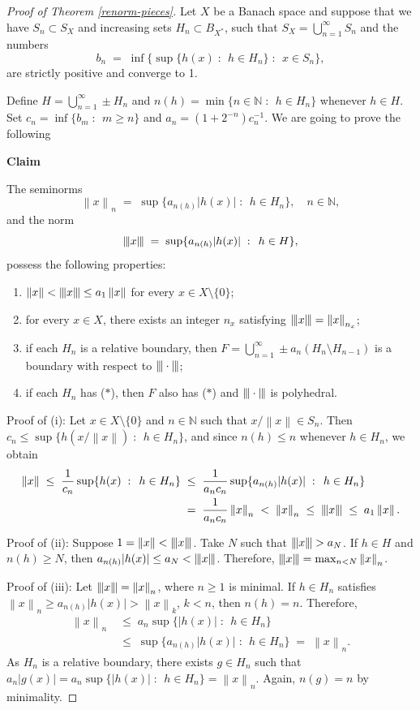\documentclass[12pt,a4paper]{amsart}
\theoremstyle{definition}
\theoremstyle{remark}
\newcommand{\n}[1]{\ensuremath{\left\|{#1}\right\|}}
\newcommand{\N}{\mathbb{N}}
\newcommand{\set}[2]{\{{#1} \;:\;\, {#2}\}}
\newcommand{\st}{($*$)}
\newcommand{\tri}{{\displaystyle |\kern-.9pt|\kern-.9pt|}}
\newcommand{\tn}[1]{\ensuremath{\tri{#1}\tri}}
\newcommand{\tndot}{\ensuremath{\tri\cdot\tri}}
\begin{document}
\begin{proof}[Proof of Theorem \ref{renorm-pieces}]
Let $X$ be a Banach space and suppose that we have $S_n \subset S_X$
and increasing sets $H_n \subset B_{X^*}$, such that $S_X = \bigcup_{n=1}^\infty S_n$ and
the numbers
\[
b_n \;=\; \inf\set{\sup\set{h(x)}{h \in  H_n}}{x \in S_n},
\]
are strictly positive and converge to 1.

Define $H = \bigcup_{n=1}^\infty \pm H_n$ and $n(h)=\min\set{n \in \N}{h \in H_n}$
whenever $h \in H$. Set $c_n = \inf\set{b_m}{m \geq n}$ and $a_n =
(1+2^{-n})c_n^{-1}$. We are going to prove the following

\textbf{Claim }

The seminorms
\[
\n{x}_n \;=\; \sup\set{a_{n(h)}|h(x)|}{h \in H_n}, \quad n \in \N,
\]
and the norm
\[
\tn{x} \;=\; \sup\set{a_{n(h)}|h(x)|}{h \in H},
\]
possess the following properties:

{\renewcommand{\theenumi}{\roman{enumi}}
\begin{enumerate}
\item \label{lemma:1:1} $\n{x} < \tn{x}\leq a_1 \n{x}$ for every
$x\in X\setminus\{0\}$;
\item \label{lemma:1:2} for every $x\in X$, there exists an integer
$n_x$ satisfying $\tn{x}=\n{x}_{n_x}$;
\item \label{lemma:1:3} if each $H_n$ is a relative boundary, then
$F = \bigcup_{n=1}^{\infty}\pm a_n (H_n\setminus H_{n-1})$ is a
boundary with respect to $\tndot$;
\item if each $H_n$ has {\st}, then $F$ also has {\st} and $\tndot$
is polyhedral.
\end{enumerate}}

Proof of (i): Let $x \in X\setminus\{0\}$ and $n \in \N$ such that $x/\n{x}
\in S_n$. Then $c_n \leq \sup\set{h(x/\n{x})}{h \in H_n}$, and since
$n(h) \leq n$ whenever $h \in H_n$, we obtain
\begin{align*}
\n{x} \;\leq\; \frac{1}{c_n}\sup\set{h(x)}{h \in H_n}
&\;\leq\; \frac{1}{a_n c_n}\sup\set{a_{n(h)}|h(x)|}{h \in H_n}\\
&\;=\; \frac{1}{a_n c_n}\n{x}_n \;<\; \n{x}_n \;\leq\; \tn{x} \;\leq\; a_1\n{x}.
\end{align*}

Proof of (ii): Suppose $1=\n{x} < \tn{x}$. Take $N$ such that $\tn{x} >
a_N$. If $h \in H$ and $n(h) \geq N$, then $a_{n(h)}|h(x)| \leq a_N
< \tn{x}$. Therefore, $\tn{x}=\max_{n < N} \n{x}_n$.

Proof of (iii): Let $\tn{x}=\n{x}_n$, where $n\geq 1$ is minimal. If $h
\in H_n$ satisfies $\n{x}_n \geq a_{n(h)}|h(x)| > \n{x}_k$, $k < n$,
then $n(h)=n$. Therefore,
\begin{align*}
\n{x}_n &\;\leq\; a_n\sup\set{|h(x)|}{h \in H_n}\\
&\;\leq\; \sup\set{a_{n(h)}|h(x)|}{h \in H_n} \;=\; \n{x}_n.
\end{align*}
As $H_n$ is a relative boundary, there exists $g \in H_n$ such that
$a_n|g(x)|= a_n\sup\set{|h(x)|}{h \in H_n}=\n{x}_n$. Again, $n(g)=n$
by minimality.


\end{proof}
\end{document}
